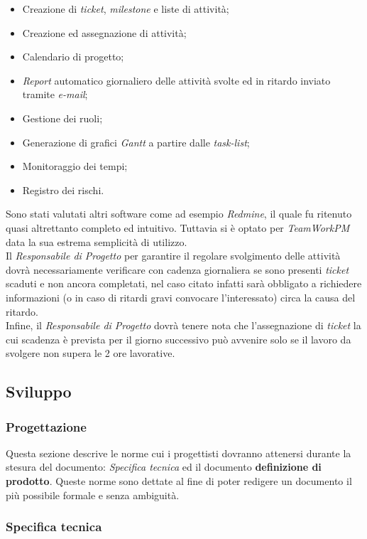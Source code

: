 \begin{itemize}
\item Creazione di \textit{ticket}, \textit{milestone} e liste di attività;
\item Creazione ed assegnazione di attività;
\item Calendario di progetto;
\item \textit{Report} automatico giornaliero delle attività svolte ed in ritardo inviato tramite \textit{e-mail};
\item Gestione dei ruoli;
\item Generazione di grafici \textit{Gantt} a partire dalle \textit{task-list};
\item Monitoraggio dei tempi;
\item Registro dei rischi.
\end{itemize}

Sono stati valutati altri software come ad esempio \textit{Redmine}, il quale fu ritenuto quasi altrettanto completo ed intuitivo. Tuttavia si è optato per \textit{TeamWorkPM} data la sua estrema semplicità di utilizzo.\\
Il \textit{Responsabile di Progetto} per garantire il regolare svolgimento delle attività dovrà necessariamente verificare con cadenza giornaliera se sono presenti \textit{ticket} scaduti e non ancora completati, nel caso citato infatti sarà obbligato a richiedere informazioni (o in caso di ritardi gravi convocare l'interessato) circa la causa del ritardo.\\
Infine, il \textit{Responsabile di Progetto} dovrà tenere nota che l'assegnazione di \textit{ticket} la cui scadenza è prevista per il giorno successivo può avvenire solo se il lavoro da svolgere non supera le 2 ore lavorative.
\subsection{Sviluppo}
\subsubsection{Progettazione}
Questa sezione descrive le norme cui i progettisti dovranno attenersi durante la stesura del documento:  \textit{Specifica tecnica} ed il documento \textbf{definizione di prodotto}. Queste norme sono dettate al fine di poter redigere un documento il più possibile formale e senza ambiguità.

\subsubsection{Specifica tecnica}
